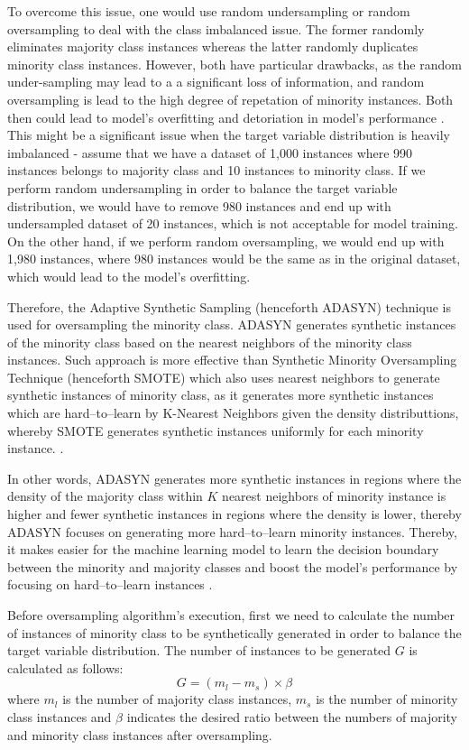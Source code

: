 To overcome this issue, one would use random undersampling or random oversampling to deal with the class imbalanced issue. The former randomly eliminates majority class instances whereas the latter randomly duplicates minority class instances.
However, both have particular drawbacks, as the random under-sampling may lead to a a significant loss of information, and random oversampling is lead to the high degree of repetation of minority instances. Both then could lead to model's overfitting and detoriation in model's performance \citep{ma2013imbalanced}.
This might be a significant issue when the target variable distribution is heavily imbalanced - assume that we have a dataset of 1,000 instances where 990 instances belongs to majority class and 10 instances to minority class.
If we perform random undersampling in order to balance the target variable distribution, we would have to remove 980 instances and end up with undersampled dataset of 20 instances, which is not acceptable for model training.
On the other hand, if we perform random oversampling, we would end up with 1,980 instances, where 980 instances would be the same as in the original dataset, which would lead to the model's overfitting.

Therefore, the Adaptive Synthetic Sampling (henceforth ADASYN) technique is used for oversampling the minority class.
ADASYN generates synthetic instances of the minority class based on the nearest neighbors of the minority class instances.
Such approach is more effective than Synthetic Minority Oversampling Technique (henceforth SMOTE) which also uses nearest neighbors to generate synthetic instances of minority class, as it generates more synthetic instances which are hard--to--learn by K-Nearest Neighbors given the density distributtions, whereby SMOTE generates synthetic instances uniformly for each minority instance.
 \citep{adasynhaibo}. 

In other words, ADASYN generates more synthetic instances in regions where the density of the majority class within $K$ nearest neighbors of minority instance is higher and fewer synthetic instances in regions where the density is lower, thereby ADASYN focuses on generating more hard--to--learn minority instances.
Thereby, it makes easier for the machine learning model to learn the decision boundary between the minority and majority classes and boost the model's performance by focusing on hard--to--learn instances \citep{adasynhaibo}.

Before oversampling algorithm's execution, first we need to calculate the number of instances of minority class to be synthetically generated in order to balance the target variable distribution. The number of instances to be generated $G$ is calculated as follows:
\begin{equation}\label{eq}
    G = \left(m_{l} - m_{s}\right) \times \beta
\end{equation}
where $m_l$ is the number of majority class instances, $m_s$ is the number of minority class instances and $\beta$ indicates the desired ratio between the numbers of majority and minority class instances after oversampling.

